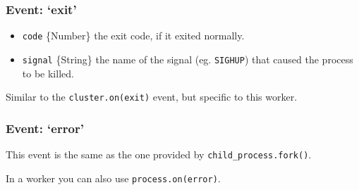 \begin{Shaded}
\begin{Highlighting}[]
\NormalTok{(}\NormalTok{, }\NormalTok{() \{}
\NormalTok{\});}
\end{Highlighting}
\end{Shaded}

\subsubsection{\texorpdfstring{Event:
`exit'}{Event: exit}}\label{event-exit-1}

\begin{itemize}
\itemsep1pt\parskip0pt
\item
  \texttt{code} \{Number\} the exit code, if it exited normally.
\item
  \texttt{signal} \{String\} the name of the signal (eg.
  \texttt{\textquotesingle{}SIGHUP\textquotesingle{}}) that caused the
  process to be killed.
\end{itemize}

Similar to the
\texttt{cluster.on(\textquotesingle{}exit\textquotesingle{})} event, but
specific to this worker.

\begin{Shaded}
\begin{Highlighting}[]
 \NormalTok{();}
\NormalTok{(}\NormalTok{, }
    \NormalTok{(}
  \NormalTok{\} }  \NormalTok{) \{}
    \NormalTok{(}
  \NormalTok{\} } \NormalTok{\{}
    \NormalTok{(}\NormalTok{);}
  \NormalTok{\}}
\NormalTok{\});}
\end{Highlighting}
\end{Shaded}

\subsubsection{\texorpdfstring{Event:
`error'}{Event: error}}\label{event-error}

This event is the same as the one provided by
\texttt{child\_process.fork()}.

In a worker you can also use
\texttt{process.on(\textquotesingle{}error\textquotesingle{})}.
